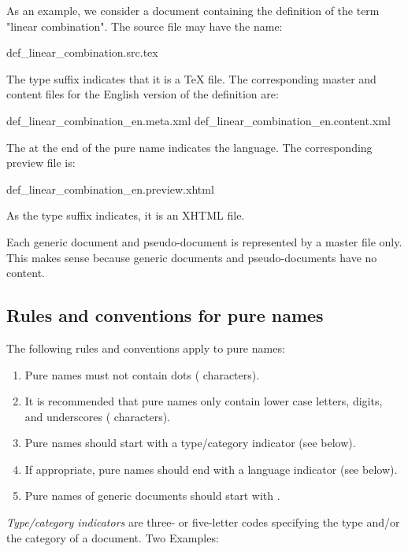 \documentclass{generic}
\begin{document}
As an example, we consider a document containing the definition of the term
"linear combination". The source file may have the name:

\begin{preformatted}def_linear_combination.src.tex\end{preformatted}

The type suffix  indicates that it is a TeX file. The corresponding
master and content files for the English version of the definition are:

\begin{preformatted}%
def_linear_combination_en.meta.xml
def_linear_combination_en.content.xml%
\end{preformatted}

The  at the end of the pure name indicates the language. The
corresponding preview file is:

\begin{preformatted}def_linear_combination_en.preview.xhtml\end{preformatted}

As the type suffix indicates, it is an XHTML file.

Each generic document and pseudo-document is represented by a master file
only. This makes sense because generic documents and pseudo-documents have no
content.

\subsection{Rules and conventions for pure names}

The following rules and conventions apply to pure names:

\begin{enumerate}
  \item Pure names must not contain dots ( characters).
  \item It is recommended that pure names only contain lower case letters,
    digits, and underscores ( characters).
  \item Pure names should start with a type/category indicator (see below).
  \item If appropriate, pure names should end with a language indicator (see
    below). 
  \item Pure names of generic documents should start with .
\end{enumerate}

\emph{Type/category indicators} are three- or five-letter codes specifying the
type and/or the category of a document. Two Examples:
\end{document}
